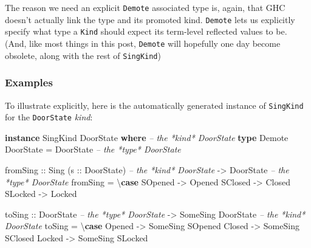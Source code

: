 \documentclass[]{article}
\newenvironment{Shaded}{}{}
\newcommand{\CommentTok}[1]{\textcolor[rgb]{0.38,0.63,0.69}{\textit{#1}}}
\newcommand{\DataTypeTok}[1]{\textcolor[rgb]{0.56,0.13,0.00}{#1}}
\newcommand{\FunctionTok}[1]{\textcolor[rgb]{0.02,0.16,0.49}{#1}}
\newcommand{\KeywordTok}[1]{\textcolor[rgb]{0.00,0.44,0.13}{\textbf{#1}}}
\newcommand{\NormalTok}[1]{#1}
\newcommand{\OtherTok}[1]{\textcolor[rgb]{0.00,0.44,0.13}{#1}}
\begin{document}
The reason we need an explicit \texttt{Demote} associated type is, again, that
GHC doesn't actually link the type and its promoted kind. \texttt{Demote} lets
us explicitly specify what type a \texttt{Kind} should expect its term-level
reflected values to be. (And, like most things in this post, \texttt{Demote}
will hopefully one day become obsolete, along with the rest of
\texttt{SingKind})

\hypertarget{examples}{%
\subsubsection{Examples}\label{examples}}

To illustrate explicitly, here is the automatically generated instance of
\texttt{SingKind} for the \texttt{DoorState} \emph{kind}:

\begin{Shaded}
\begin{Highlighting}[]
\KeywordTok{instance} \DataTypeTok{SingKind} \DataTypeTok{DoorState} \KeywordTok{where}       \CommentTok{-- the *kind* DoorState}
    \KeywordTok{type} \DataTypeTok{Demote} \DataTypeTok{DoorState} \FunctionTok{=} \DataTypeTok{DoorState}   \CommentTok{-- the *type* DoorState}

\NormalTok{    fromSing}
\OtherTok{        ::} \DataTypeTok{Sing}\NormalTok{ (}\OtherTok{s ::} \DataTypeTok{DoorState}\NormalTok{)        }\CommentTok{-- the *kind* DoorState}
        \OtherTok{->} \DataTypeTok{DoorState}                    \CommentTok{-- the *type* DoorState}
\NormalTok{    fromSing }\FunctionTok{=}\NormalTok{ \textbackslash{}}\KeywordTok{case}
        \DataTypeTok{SOpened} \OtherTok{->} \DataTypeTok{Opened}
        \DataTypeTok{SClosed} \OtherTok{->} \DataTypeTok{Closed}
        \DataTypeTok{SLocked} \OtherTok{->} \DataTypeTok{Locked}

\NormalTok{    toSing}
\OtherTok{        ::} \DataTypeTok{DoorState}                    \CommentTok{-- the *type* DoorState}
        \OtherTok{->} \DataTypeTok{SomeSing} \DataTypeTok{DoorState}           \CommentTok{-- the *kind* DoorState}
\NormalTok{    toSing }\FunctionTok{=}\NormalTok{ \textbackslash{}}\KeywordTok{case}
        \DataTypeTok{Opened} \OtherTok{->} \DataTypeTok{SomeSing} \DataTypeTok{SOpened}
        \DataTypeTok{Closed} \OtherTok{->} \DataTypeTok{SomeSing} \DataTypeTok{SClosed}
        \DataTypeTok{Locked} \OtherTok{->} \DataTypeTok{SomeSing} \DataTypeTok{SLocked}
\end{Highlighting}
\end{Shaded}
\end{document}

